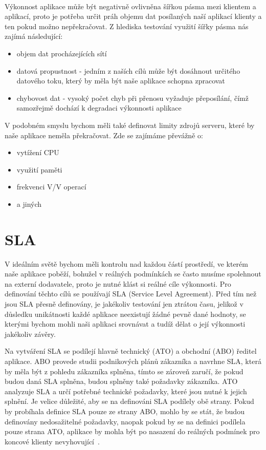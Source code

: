 \documentclass[122pt,oneside]{fithesis}
\begin{document}
\vspace{5 mm}
\\\indent Výkonnost aplikace může být negativně ovlivněna šířkou pásma mezi klientem a aplikací, proto je potřeba určit práh objemu dat posílaných naší aplikací klienty a ten pokud možno nepřekračovat. Z hlediska testování využití šířky pásma nás zajímá následující:
\begin{itemize}
  \item objem dat procházejících sítí
  \item datová propustnost - jedním z naších cílů může být dosáhnout určitého datového toku, který by měla být naše aplikace schopna zpracovat
  \item chybovost dat - vysoký počet chyb při přenosu vyžaduje přeposílání, čímž samozřejmě dochází k degradaci výkonnosti aplikace
\end{itemize}
V podobném smyslu bychom měli také definovat limity zdrojů serveru, které by naše aplikace neměla překračovat. Zde se zajímáme převážně o:
\begin{itemize}
  \item vytížení CPU
  \item využití paměti
  \item frekvenci V/V operací
  \item a jiných
\end{itemize}

\section{SLA}
V ideálním světě bychom měli kontrolu nad každou částí prostředí, ve kterém naše aplikace poběží, bohužel v reálných podmínkách se často musíme spolehnout na externí dodavatele, proto je nutné klást si reálné cíle výkonnosti. Pro definování těchto cílů se používají SLA (Service Level Agreement). Před tím než jsou SLA přesně definovány, je jakékoliv testování jen ztrátou času, jelikož v důsledku unikátnosti každé aplikace neexistují žádné pevně dané hodnoty, se kterými bychom mohli naši aplikaci srovnávat a tudíž dělat o její výkonnosti jakékoliv závěry.

Na vytváření SLA se podílejí hlavně technický (ATO) a obchodní (ABO) ředitel aplikace. ABO provede studii podnikových plánů zákazníka a navrhne SLA, která by měla být z pohledu zákazníka splněna, tímto se zároveň zaručí, že pokud budou daná SLA splněna, budou splněny také požadavky zákazníka. ATO analyzuje SLA a určí potřebné technické požadavky, které jsou nutné k jejich splnění. Je velice důležité, aby se na definováni SLA podílely obě strany. Pokud by probíhala definice SLA pouze ze strany ABO, mohlo by se stát, že budou definovány nedosažitelné požadavky, naopak pokud by se na definici podílela pouze strana ATO, aplikace by mohla být po nasazení do reálných podmínek pro koncové klienty nevyhovující~\cite{haines06}.
\end{document}
